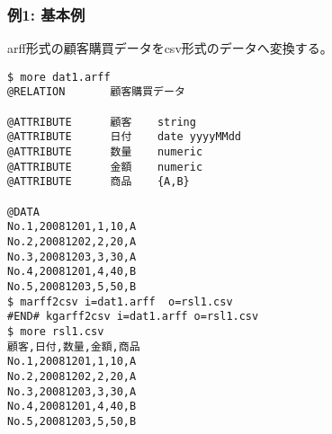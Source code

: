 \subsubsection*{例1: 基本例}

arff形式の顧客購買データをcsv形式のデータへ変換する。


\begin{Verbatim}[baselinestretch=0.7,frame=single]
$ more dat1.arff
@RELATION       顧客購買データ

@ATTRIBUTE      顧客    string
@ATTRIBUTE      日付    date yyyyMMdd
@ATTRIBUTE      数量    numeric
@ATTRIBUTE      金額    numeric
@ATTRIBUTE      商品    {A,B}

@DATA
No.1,20081201,1,10,A
No.2,20081202,2,20,A
No.3,20081203,3,30,A
No.4,20081201,4,40,B
No.5,20081203,5,50,B
$ marff2csv i=dat1.arff  o=rsl1.csv
#END# kgarff2csv i=dat1.arff o=rsl1.csv
$ more rsl1.csv
顧客,日付,数量,金額,商品
No.1,20081201,1,10,A
No.2,20081202,2,20,A
No.3,20081203,3,30,A
No.4,20081201,4,40,B
No.5,20081203,5,50,B
\end{Verbatim}

